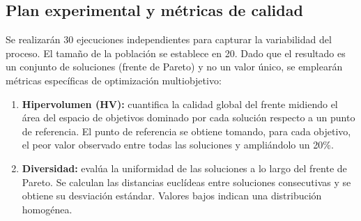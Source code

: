 \subsection*{Plan experimental y métricas de calidad}
Se realizarán 30 ejecuciones independientes para capturar la variabilidad del proceso. 
El tamaño de la población se establece en 20.
Dado que el resultado es un conjunto de soluciones (frente de Pareto) y no un valor único, 
se emplearán métricas específicas de optimización multiobjetivo:
\begin{enumerate}
    \item \textbf{Hipervolumen (HV):} cuantifica la calidad global del frente midiendo 
    el área del espacio de objetivos dominado por cada solución respecto a un punto de 
    referencia. El punto de referencia se obtiene tomando, para cada
objetivo, el peor valor observado entre todas las soluciones y ampliándolo un 20\%. %
    
    \item \textbf{Diversidad:} evalúa la uniformidad de las soluciones a lo largo del 
    frente de Pareto. Se calculan las distancias
    euclídeas entre soluciones consecutivas y se obtiene su desviación estándar.
    Valores bajos indican una distribución homogénea.
\end{enumerate}



